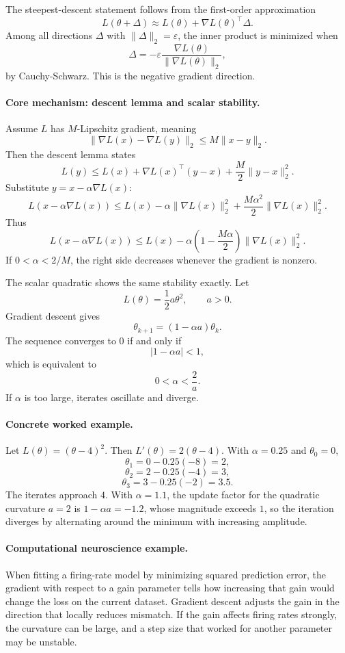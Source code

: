 The steepest-descent statement follows from the first-order approximation
\[
L(\theta+\Delta)\approx L(\theta)+\nabla L(\theta)^\top \Delta.
\]
Among all directions \(\Delta\) with \(\|\Delta\|_2=\varepsilon\), the inner product is minimized when
\[
\Delta=-\varepsilon\frac{\nabla L(\theta)}{\|\nabla L(\theta)\|_2},
\]
by Cauchy-Schwarz. This is the negative gradient direction.

\paragraph{Core mechanism: descent lemma and scalar stability.}
Assume \(L\) has \(M\)-Lipschitz gradient, meaning
\[
\|\nabla L(x)-\nabla L(y)\|_2\le M\|x-y\|_2.
\]
Then the descent lemma states
\[
L(y)\le L(x)+\nabla L(x)^\top(y-x)+\frac{M}{2}\|y-x\|_2^2.
\]
Substitute \(y=x-\alpha\nabla L(x)\):
\[
L(x-\alpha\nabla L(x))
\le
L(x)-\alpha\|\nabla L(x)\|_2^2
+\frac{M\alpha^2}{2}\|\nabla L(x)\|_2^2.
\]
Thus
\[
L(x-\alpha\nabla L(x))
\le
L(x)-\alpha\left(1-\frac{M\alpha}{2}\right)\|\nabla L(x)\|_2^2.
\]
If \(0<\alpha<2/M\), the right side decreases whenever the gradient is nonzero.

The scalar quadratic shows the same stability exactly. Let
\[
L(\theta)=\frac12 a\theta^2,\qquad a>0.
\]
Gradient descent gives
\[
\theta_{k+1}=(1-\alpha a)\theta_k.
\]
The sequence converges to \(0\) if and only if
\[
|1-\alpha a|<1,
\]
which is equivalent to
\[
\boxed{0<\alpha<\frac{2}{a}.}
\]
If \(\alpha\) is too large, iterates oscillate and diverge.

\paragraph{Concrete worked example.}
Let \(L(\theta)=(\theta-4)^2\). Then \(L'(\theta)=2(\theta-4)\). With \(\alpha=0.25\) and \(\theta_0=0\),
\[
\theta_1=0-0.25(-8)=2,
\]
\[
\theta_2=2-0.25(-4)=3,
\]
\[
\theta_3=3-0.25(-2)=3.5.
\]
The iterates approach \(4\). With \(\alpha=1.1\), the update factor for the quadratic curvature \(a=2\) is \(1-\alpha a=-1.2\), whose magnitude exceeds \(1\), so the iteration diverges by alternating around the minimum with increasing amplitude.

\paragraph{Computational neuroscience example.}
When fitting a firing-rate model by minimizing squared prediction error, the gradient with respect to a gain parameter tells how increasing that gain would change the loss on the current dataset. Gradient descent adjusts the gain in the direction that locally reduces mismatch. If the gain affects firing rates strongly, the curvature can be large, and a step size that worked for another parameter may be unstable.

